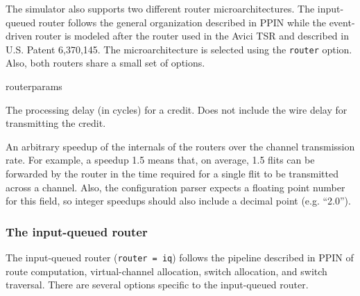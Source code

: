 \documentclass[11pt]{article}
\begin{document}
The simulator also supports two different router microarchitectures.
The input-queued router follows the general organization described in
PPIN while the event-driven router is modeled after the router used in
the Avici TSR and described in U.S. Patent 6,370,145.  The
microarchitecture is selected using the \texttt{router} option.  Also,
both routers share a small set of options.

\begin{opt_list}{routerparams}
\item[credit\_delay] The processing delay (in cycles) for a credit.
Does not include the wire delay for transmitting the credit.

\item[internal\_speedup] An arbitrary speedup of the internals of the
routers over the channel transmission rate.  For example, a speedup
1.5 means that, on average, 1.5 flits can be forwarded by the router
in the time required for a single flit to be transmitted across a
channel.  Also, the configuration parser expects a floating point
number for this field, so integer speedups should also include a
decimal point (e.g. ``2.0'').

\end{opt_list}

\subsubsection{The input-queued router}
\label{sec:iq_router}

The input-queued router (\texttt{router = iq}) follows the pipeline
described in PPIN of route computation, virtual-channel allocation,
switch allocation, and switch traversal.  There are several options
specific to the input-queued router.
\end{document}
